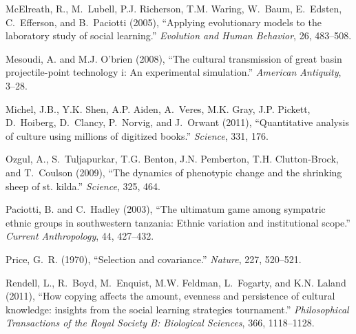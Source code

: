 \documentclass[11pt]{article}
\begin{document}
\begin{thebibliography}{32}
McElreath, R., M.~Lubell, P.J. Richerson, T.M. Waring, W.~Baum, E.~Edsten,
  C.~Efferson, and B.~Paciotti (2005), \enquote{Applying evolutionary models to
  the laboratory study of social learning.} \emph{Evolution and Human
  Behavior}, 26, 483--508.

Mesoudi, A. and M.J. O'brien (2008), \enquote{The cultural transmission of
  great basin projectile-point technology i: An experimental simulation.}
  \emph{American Antiquity}, 3--28.

Michel, J.B., Y.K. Shen, A.P. Aiden, A.~Veres, M.K. Gray, J.P. Pickett,
  D.~Hoiberg, D.~Clancy, P.~Norvig, and J.~Orwant (2011), \enquote{Quantitative
  analysis of culture using millions of digitized books.} \emph{Science}, 331,
  176.

Ozgul, A., S.~Tuljapurkar, T.G. Benton, J.N. Pemberton, T.H. Clutton-Brock, and
  T.~Coulson (2009), \enquote{The dynamics of phenotypic change and the
  shrinking sheep of st. kilda.} \emph{Science}, 325, 464.

Paciotti, B. and C.~Hadley (2003), \enquote{The ultimatum game among sympatric
  ethnic groups in southwestern tanzania: Ethnic variation and institutional
  scope.} \emph{Current Anthropology}, 44, 427--432.

Price, G.~R. (1970), \enquote{Selection and covariance.} \emph{Nature}, 227,
  520--521.

Rendell, L., R.~Boyd, M.~Enquist, M.W. Feldman, L.~Fogarty, and K.N. Laland
  (2011), \enquote{How copying affects the amount, evenness and persistence of
  cultural knowledge: insights from the social learning strategies tournament.}
  \emph{Philosophical Transactions of the Royal Society B: Biological
  Sciences}, 366, 1118--1128.


\end{thebibliography}
\end{document}
